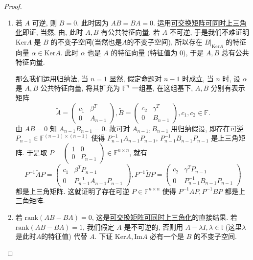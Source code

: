 \documentclass[../../main.tex]{subfiles}%
\begin{document}
\begin{proof}
\begin{enumerate}[(1)]
\item 若 \( A \) 可逆, 则 \( B = 0 \). 此时因为 \( AB = BA = 0 \). 运用\hyperref[proposition:一族两两可交换的一般域上的矩阵可同时上三角化]{可交换矩阵可同时上三角化}即证, 当然, 由, 此时 \( A, B \) 有公共特征向量. 若 \( A \) 不可逆, 于是我们不难证明 \( \mathrm{Ker} A \) 是 \( B \) 的不变子空间(当然也是$A$的不变子空间), 所以存在 \( B|_{\mathrm{Ker} A} \) 的特征向量 \( \alpha \in \mathrm{Ker} A \). 此时 \( \alpha \) 也是 \( A \) 的特征向量 (特征值为 0), 于是 \( A, B \) 总有公共特征向量.

那么我们运用归纳法, 当 \( n = 1 \) 显然, 假定命题对 \( n - 1 \) 时成立, 当 \( n \) 时, 设 \( \alpha \) 是 \( A, B \) 公共特征向量, 将其扩充为 \( \mathbb{F}^n \) 一组基, 在这组基下, \( A, B \) 分别有表示矩阵
\[
\widetilde{A} = \begin{pmatrix} c_1 & \beta^T \\ 0 & A_{n - 1} \end{pmatrix}, \widetilde{B} = \begin{pmatrix} c_2 & \gamma^T \\ 0 & B_{n - 1} \end{pmatrix}, c_1, c_2 \in \mathbb{F}.
\]
由 \( AB = 0 \) 知 \( A_{n - 1}B_{n - 1} = 0 \). 故可对 \( A_{n - 1}, B_{n - 1} \) 用归纳假设, 即存在可逆 \( P_{n - 1} \in \mathbb{F}^{(n - 1) \times (n - 1)} \) 使得 $P_{n - 1}^{-1}A_{n - 1}P_{n - 1}$, $P_{n - 1}^{-1}$$B_{n - 1}$$P_{n - 1}$ 是上三角矩阵. 于是取 \( P = \begin{pmatrix} 1 & 0 \\ 0 & P_{n - 1} \end{pmatrix} \in \mathbb{F}^{n \times n} \), 就有
\[
P^{-1}\widetilde{A}P = \begin{pmatrix} c_1 & \beta^T P_{n - 1} \\ 0 & P_{n - 1}^{-1}A_{n - 1}P_{n - 1} \end{pmatrix}, P^{-1}\widetilde{B}P = \begin{pmatrix} c_2 & \gamma^T P_{n - 1} \\ 0 & P_{n - 1}^{-1}B_{n - 1}P_{n - 1} \end{pmatrix}
\]
都是上三角矩阵. 这就证明了存在可逆 \( P \in \mathbb{F}^{n \times n} \) 使得 \( P^{-1}AP, P^{-1}BP \) 都是上三角矩阵.

\item 若 \( \mathrm{rank}(AB - BA) = 0 \), 这是\hyperref[proposition:一族两两可交换的一般域上的矩阵可同时上三角化]{可交换矩阵可同时上三角化}的直接结果. 若 \( \mathrm{rank}(AB - BA) = 1 \), 我们假定 \( A \) 是不可逆的, 否则用 \( A - \lambda I, \lambda \in \mathbb{F} \)(这里$\lambda$是此时$A$的特征值) 代替 \( A \). 下证 \( \mathrm{Ker} A, \mathrm{Im} A \) 必有一个是 \( B \) 的不变子空间.


\end{enumerate}
\end{proof}
\end{document}
